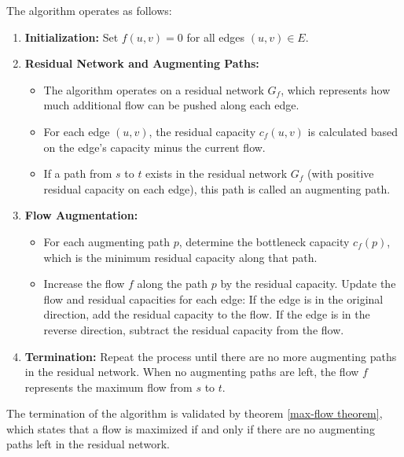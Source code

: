 \noindent The algorithm operates as follows:
\begin{enumerate}
    \item \textbf{Initialization:} Set $f(u, v) = 0$ for all edges $(u, v) \in E$.
    \item \textbf{Residual Network and Augmenting Paths:} 
    \begin{itemize}
        \item The algorithm operates on a residual network $G_f$, which represents how much additional flow can be pushed along each edge.
        \item For each edge $(u,v)$, the residual capacity $c_f(u,v)$ is calculated based on the edge’s capacity minus the current flow. 
        \item If a path from $s$ to $t$ exists in the residual network $G_f$ (with positive residual capacity on each edge), this path is called an augmenting path.
    \end{itemize}
    \item \textbf{Flow Augmentation:} 
    \begin{itemize}
        \item For each augmenting path $p$, determine the bottleneck capacity $c_f(p)$, which is the minimum residual capacity along that path.
        \item Increase the flow $f$ along the path $p$ by the residual capacity. Update the flow and residual capacities for each edge: If the edge is in the original direction, add the residual capacity to the flow. If the edge is in the reverse direction, subtract the residual capacity from the flow.
    \end{itemize}
    \item \textbf{Termination:} Repeat the process until there are no more augmenting paths in the residual network. When no augmenting paths are left, the flow $f$ represents the maximum flow from $s$ to $t$.
\end{enumerate}
The termination of the algorithm is validated by theorem \ref{max-flow theorem}, which states that a flow is maximized if and only if there are no augmenting paths left in the residual network.

